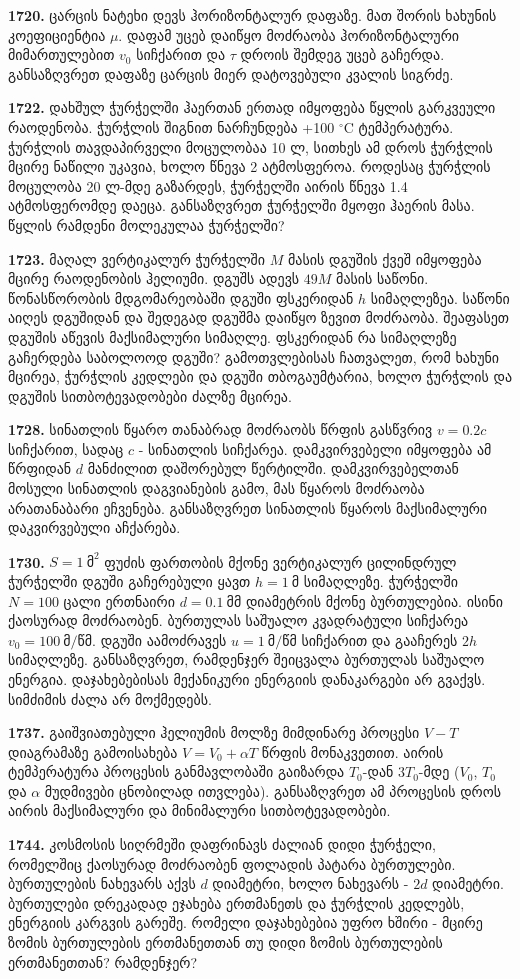 \documentclass[12pt,a4paper,]{report}
\begin{document}
\textbf{1720.} ცარცის ნატეხი დევს ჰორიზონტალურ დაფაზე. მათ შორის ხახუნის კოეფიციენტია $\mu$. დაფამ უცებ დაიწყო მოძრაობა ჰორიზონტალური მიმართულებით $v_0$ სიჩქარით და $\tau$ დროის შემდეგ უცებ გაჩერდა. განსაზღვრეთ დაფაზე ცარცის მიერ დატოვებული კვალის სიგრძე.

\textbf{1722.} დახშულ ჭურჭელში ჰაერთან ერთად იმყოფება წყლის გარკვეული რაოდენობა. ჭურჭლის შიგნით ნარჩუნდება +100 $^{\circ}$C ტემპერატურა. ჭურჭლის თავდაპირველი მოცულობაა 10 ლ, სითხეს ამ დროს ჭურჭლის მცირე ნაწილი უკავია, ხოლო წნევა 2 ატმოსფეროა. როდესაც ჭურჭლის მოცულობა 20 ლ-მდე გაზარდეს, ჭურჭელში აირის წნევა 1.4 ატმოსფერომდე დაეცა. განსაზღვრეთ ჭურჭელში მყოფი ჰაერის მასა. წყლის რამდენი მოლეკულაა ჭურჭელში?

\textbf{1723.} მაღალ ვერტიკალურ ჭურჭელში $M$ მასის დგუშის ქვეშ იმყოფება მცირე რაოდენობის ჰელიუმი. დგუშს ადევს $49M$ მასის საწონი. წონასწორობის მდგომარეობაში დგუში ფსკერიდან $h$ სიმაღლეზეა. საწონი აიღეს დგუშიდან და შედეგად დგუშმა დაიწყო ზევით მოძრაობა. შეაფასეთ დგუშის აწევის მაქსიმალური სიმაღლე. ფსკერიდან რა სიმაღლეზე გაჩერდება საბოლოოდ დგუში? გამოთვლებისას ჩათვალეთ, რომ ხახუნი მცირეა, ჭურჭლის კედლები და დგუში თბოგაუმტარია, ხოლო ჭურჭლის და დგუშის სითბოტევადობები ძალზე მცირეა.

\textbf{1728.} სინათლის წყარო თანაბრად მოძრაობს წრფის გასწვრივ $v=0.2c$ სიჩქარით, სადაც $c$ - სინათლის სიჩქარეა. დამკვირვებელი იმყოფება ამ წრფიდან $d$ მანძილით დაშორებულ წერტილში. დამკვირვებელთან მოსული სინათლის დაგვიანების გამო, მას წყაროს მოძრაობა არათანაბარი ეჩვენება. განსაზღვრეთ სინათლის წყაროს მაქსიმალური დაკვირვებული აჩქარება.   

\textbf{1730.} $S = 1\ \text{მ}^2$ ფუძის ფართობის მქონე ვერტიკალურ ცილინდრულ ჭურჭელში დგუში გაჩერებული ყავთ $h = 1\ \text{მ}$ სიმაღლეზე. ჭურჭელში $N = 100$ ცალი ერთნაირი $d = 0.1\ \text{მმ}$ დიამეტრის მქონე ბურთულებია. ისინი ქაოსურად მოძრაობენ. ბურთულას საშუალო კვადრატული სიჩქარეა $v_0 = 100\ \text{მ/წმ}$. დგუში აამოძრავეს $u = 1\ \text{მ/წმ}$ სიჩქარით და გააჩერეს $2h$ სიმაღლეზე. განსაზღვრეთ, რამდენჯერ შეიცვალა ბურთულას საშუალო ენერგია. დაჯახებებისას მექანიკური ენერგიის დანაკარგები არ გვაქვს. სიმძიმის ძალა არ მოქმედებს.

\textbf{1737.} გაიშვიათებული ჰელიუმის მოლზე მიმდინარე პროცესი  $V-T$ დიაგრამაზე გამოისახება $V=V_0+\alpha T$ წრფის მონაკვეთით. აირის ტემპერატურა პროცესის განმავლობაში გაიზარდა $T_0$-დან $3T_0$-მდე  ($V_0$, $T_0$ და $\alpha$ მუდმივები ცნობილად ითვლება). განსაზღვრეთ ამ პროცესის დროს აირის მაქსიმალური და მინიმალური სითბოტევადობები.

\textbf{1744.} კოსმოსის სიღრმეში დაფრინავს ძალიან დიდი ჭურჭელი, რომელშიც ქაოსურად მოძრაობენ ფოლადის პატარა ბურთულები. ბურთულების ნახევარს აქვს $d$ დიამეტრი, ხოლო ნახევარს - $2d$ დიამეტრი. ბურთულები დრეკადად ეჯახება ერთმანეთს და ჭურჭლის კედლებს, ენერგიის კარგვის გარეშე. რომელი დაჯახებებია უფრო ხშირი - მცირე ზომის ბურთულების ერთმანეთთან თუ დიდი ზომის ბურთულების ერთმანეთთან? რამდენჯერ?                      
\end{document}
